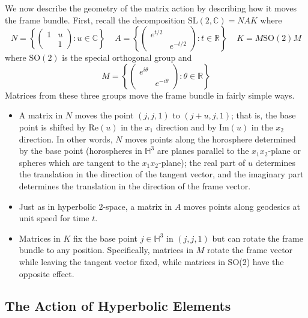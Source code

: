 \documentclass[]{article}
\begin{document}
We now describe the geometry of the matrix action by describing how it moves the frame bundle.
First, recall the decomposition $\text{SL}(2, \mathbb{C}) = NAK$ where
$$
N = \left\{ 
\begin{pmatrix}
1 & u \\
~ & 1
\end{pmatrix} : u \in \mathbb{C}
\right\} ~~~~~
A = \left\{
\begin{pmatrix}
e^{t/2} & ~ \\
~ & e^{-t/2}
\end{pmatrix} : t \in \mathbb{R}
\right\} ~~~~~
K = M\text{SO}(2)M
$$
where $\text{SO}(2)$ is the special orthogonal group and
$$
M = \left\{
\begin{pmatrix}
e^{i\theta} & ~ \\
~ & e^{-i\theta}
\end{pmatrix} : \theta \in \mathbb{R}
\right\}
$$
Matrices from these three groups move the frame bundle in fairly simple ways.
\begin{itemize}
	\item A matrix in $N$ moves the point $(j, j, 1)$ to $(j + u, j, 1)$; that is, the base point is shifted by Re$(u)$ in the $x_1$ direction and by Im$(u)$ in the $x_2$ direction.
	In other words, $N$ moves points along the horosphere determined by the base point (horospheres in $\mathbb{H}^3$ are planes parallel to the $x_1x_2$-plane or spheres which are tangent to the $x_1x_2$-plane); the real part of $u$ determines the translation in the direction of the tangent vector, and the imaginary part determines the translation in the direction of the frame vector.
	\item Just as in hyperbolic 2-space, a matrix in $A$ moves points along geodesics at unit speed for time $t$.
	\item Matrices in $K$ fix the base point $j \in \mathbb{H}^3$ in $(j, j, 1)$ but can rotate the frame bundle to any position. Specifically, matrices in $M$ rotate the frame vector while leaving the tangent vector fixed, while matrices in SO(2) have the opposite effect.
\end{itemize}

\subsection*{The Action of Hyperbolic Elements}
\end{document}
